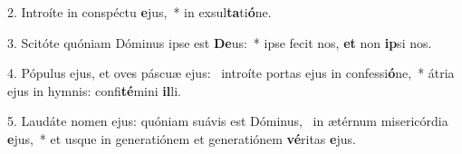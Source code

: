 2. Introíte in conspéctu \textbf{e}jus,~*  in exsul\textbf{ta}ti\textbf{ó}ne.\

3. Scitóte quóniam Dóminus ipse est \textbf{De}us:~*  ipse fecit nos, \textbf{et} non \textbf{ip}si nos.\

4. Pópulus ejus, et oves páscuæ ejus: \dag\  introíte portas ejus in confessi\textbf{ó}ne,~*  átria ejus in hymnis: confi\textbf{té}mini \textbf{il}li.\

5. Laudáte nomen ejus: quóniam suávis est Dóminus, \dag\  in ætérnum misericórdia \textbf{e}jus,~*  et usque in generatiónem et generatiónem \textbf{vé}ritas \textbf{e}jus.\

